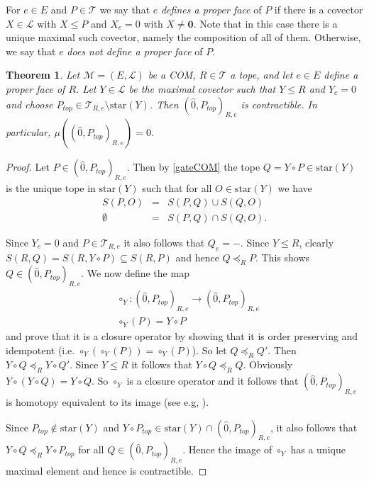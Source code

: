 \documentclass[12pt]{amsart}
\def\Tscr{{\mathcal T}}
\def\M{{\mathcal M}}
\def\cstar{{\mathrm{star}}}
\theoremstyle{plain}
\numberwithin{Lemma}{\DefaultNumberTheoremWithin}
\numberwithin{Claim}{\DefaultNumberTheoremWithin}
\newtheorem{Theorem}{Theorem}
\numberwithin{Theorem}{\DefaultNumberTheoremWithin}
\numberwithin{Corollary}{\DefaultNumberTheoremWithin}
\numberwithin{Proposition}{\DefaultNumberTheoremWithin}
\numberwithin{Conjecture}{\DefaultNumberTheoremWithin}
\numberwithin{Situation}{\DefaultNumberTheoremWithin}
\numberwithin{Note}{\DefaultNumberTheoremWithin}
\theoremstyle{definition}
\numberwithin{Definition}{\DefaultNumberTheoremWithin}
\theoremstyle{definition}
\numberwithin{Question}{\DefaultNumberTheoremWithin}
\theoremstyle{definition}
\numberwithin{Problem}{\DefaultNumberTheoremWithin}
\theoremstyle{remark} \newtheorem{Remark}{Remark}
\numberwithin{Remark}{\DefaultNumberTheoremWithin}
\theoremstyle{remark}
\numberwithin{Example}{\DefaultNumberTheoremWithin}
\numberwithin{Case}{Lemma}
\numberwithin{Step}{Lemma}
\begin{document}
For $e \in E$ and $P \in \Tscr$ we say that $e$ \emph{defines a proper face} of $P$
if there is a covector $X \in \mathcal{L}$ with $X \leq P$ and $X_e =
0$ with $X\neq \mathbf{0}$. Note that in this case there is a unique maximal such covector, namely the composition of all of them. Otherwise, we say that $e$ \emph{does not define a proper face} of $P$.


\begin{Theorem}
  \label{thm:moebius}
  Let $\M=(E,\mathcal{L})$ be a COM, $R \in \Tscr$ a tope, and let $e \in E$ define a proper face of $R$. 
  Let $Y \in \mathcal{L}$ 
  be the maximal covector such that $Y \leq R$ and $Y_e = 0$
  and choose 
  $P_{top} \in \Tscr_{R,e} \setminus \cstar(Y)$. Then
  $(\hat{0},P_{top})_{R,e}$ is contractible. 
  In particular, $\mu((\hat{0},P_{top})_{R,e}) = 0$.
\end{Theorem}

\begin{proof} 
Let $P \in (\hat{0},P_{top})_{R,e}$. Then by \ref{gateCOM} the tope
  $Q = Y \circ P \in \cstar(Y)$ is the unique tope in $\cstar(Y)$ 
  such that for all $O \in \cstar(Y)$ we have
  \begin{eqnarray*}
    S(P,O) & = & S(P,Q) \cup S(Q,O) \\
    \emptyset & = &  S(P,Q) \cap S(Q,O).
  \end{eqnarray*}

Since $Y_e = 0$ and $P \in \Tscr_{R,e}$ it also follows that $Q_e = -$.
  Since $Y \le R$, clearly $S(R,Q) =S(R,Y \circ P)\subseteq
  S(R,P)$ and hence $Q \preceq_R P$.  This shows $Q \in
  (\hat{0},P_{top})_{R,e}$.
We now define the map 
\begin{align*}
&\circ_Y: (\hat{0},P_{top})_{R,e}
  \rightarrow (\hat{0},P_{top})_{R,e}\\
&\circ_Y(P) = Y \circ P
\end{align*}  
   and prove that it is a closure operator by showing that it is order preserving and idempotent (i.e. $\circ_Y(\circ_Y(P)) = \circ_Y(P)$). So let $Q \preceq_R Q'$. Then $Y \circ Q
  \preceq_R Y \circ Q'$. Since $Y \leq R$ it follows that $Y \circ Q
  \preceq_R Q$. Obviously $Y \circ (Y \circ Q) = Y \circ Q$. So $\circ_Y$ is a closure operator and it follows that $(\hat{0},P_{top})_{R,e}$ is homotopy equivalent to its
  image (see e.g, \cite[Corollary 10.12]{Bj}).   

  Since $P_{top} \not\in \cstar(Y)$ and $Y \circ P_{top}  \in \cstar(Y)
  \cap (\hat{0},P_{top})_{R,e}$, 
  it also follows that $Y \circ Q \preceq_R Y \circ P_{top}$ for all 
  $Q \in (\hat{0},P_{top})_{R,e}$. Hence the image of $\circ_Y$ has
  a unique maximal element and hence is contractible.  
\end{proof}
\end{document}
